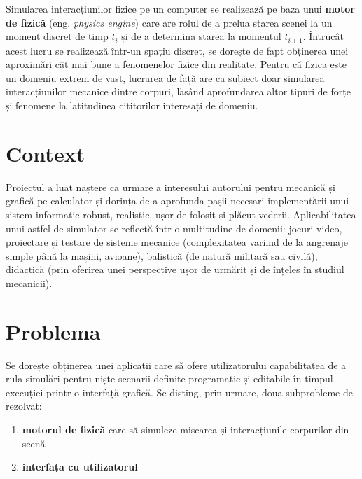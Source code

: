 \documentclass[12pt,a4paper]{report}
\newcommand{\worktype}[1]{[\textit{#1}] }
\newcommand{\dezvoltare}{\worktype{Dezvoltare de produs}}
\newcommand{\cercetare}{\worktype{Cercetare}}
\begin{document}
%
Simularea interacțiunilor fizice pe un computer se realizează pe baza unui \textbf{motor de fizică} (eng. \textit{physics engine}) care are rolul de a prelua starea scenei la un moment discret de timp $t_i$ și de a determina starea la momentul $t_{i+1}$. Întrucât acest lucru se realizează într-un spațiu discret, se dorește de fapt obținerea unei aproximări cât mai bune a fenomenelor fizice din realitate. Pentru că fizica este un domeniu extrem de vast, lucrarea de față are ca subiect doar simularea interacțiunilor mecanice dintre corpuri, lăsând aprofundarea altor tipuri de forțe și fenomene la latitudinea cititorilor interesați de domeniu. 
\section{Context}
Proiectul a luat naștere ca urmare a interesului autorului pentru mecanică și grafică pe calculator și dorința de a aprofunda pașii necesari implementării unui sistem informatic robust, realistic, ușor de folosit și plăcut vederii.
Aplicabilitatea unui astfel de simulator se reflectă într-o multitudine de domenii: jocuri video, proiectare și testare de sisteme mecanice (complexitatea variind de la angrenaje simple până la mașini, avioane), balistică (de natură militară sau civilă), didactică (prin oferirea unei perspective ușor de urmărit și de înțeles în studiul mecanicii).
\section{Problema} 
Se dorește obținerea unei aplicații care să ofere utilizatorului capabilitatea de a rula simulări pentru niște scenarii definite programatic și editabile în timpul execuției printr-o interfață grafică.
Se disting, prin urmare, două subprobleme de rezolvat:
\begin{enumerate}
	\item \textbf{motorul de fizică} care să simuleze mișcarea și interacțiunile corpurilor din scenă
	\item \textbf{interfața cu utilizatorul}
\end{enumerate}
\end{document}
